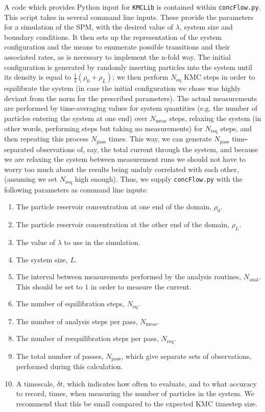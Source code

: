A code which provides Python input for \texttt{KMCLib} is contained within 
\texttt{concFlow.py}. This script takes in several command line inputs. These provide the parameters for
a simulation of the SPM, with the desired value of $\lambda$, system size and boundary conditions. It 
then sets up the representation of the system configuration and the means to enumerate possible
transitions and their associated rates, as is necessary to implement the n-fold way.
The initial configuration is generated by randomly inserting particles into the system until its density
is equal to $\frac{1}{2}\left(\rho_0 + \rho_L \right)$; we then perform $N_{\mathrm{eq}}$ KMC steps in order to 
equilibrate the system (in case the initial configuration we chose was highly deviant from the norm
for the prescribed parameters). The actual measurements are performed by time-averaging values for system
quantities (e.g. the number of particles entering the system at one end) over $N_{\mathrm{meas}}$ steps,
relaxing the system (in other words, performing steps but taking no measurements) for $N_{\mathrm{req}}$ steps,
and then repeating this process $N_{\mathrm{pass}}$ times. This way, we can generate $N_{\mathrm{pass}}$ time-separated 
observations of, say, the total current through the system, and because we are relaxing the system 
between measurement runs we should not have to worry too much about the results being unduly correlated
with each other, (assuming we set $N_{\mathrm{req}}$ high enough).
Thus, we supply \texttt{concFlow.py} with the following parameters as 
command line inputs:
\begin{enumerate}
 \item The particle reservoir concentration at one end of the domain, $\rho_0$.
 \item The particle reservoir concentration at the other end of the domain, $\rho_L$.
 \item The value of $\lambda$ to use in the simulation.
 \item The system size, $L$.
 \item The interval between measurements performed by the analysis
 routines, $N_{\mathrm{anal}}$. This should be set to $1$ in order to measure the current.
 \item The number of equilibration steps, $N_{\mathrm{eq}}$.
 \item The number of analysis steps per pass, $N_{\mathrm{meas}}$.
 \item The number of reequilibration steps per pass, $N_{\mathrm{req}}$.
 \item The total number of passes, $N_{\mathrm{pass}}$, which give separate
 sets of observations, performed during this calculation.
 \item A timescale, $\delta t$, which indicates how often to evaluate,
 and to what accuracy to record, times, when measuring the number of 
 particles in the system. We recommend that this be small compared to the expected KMC timestep size.
\end{enumerate}

